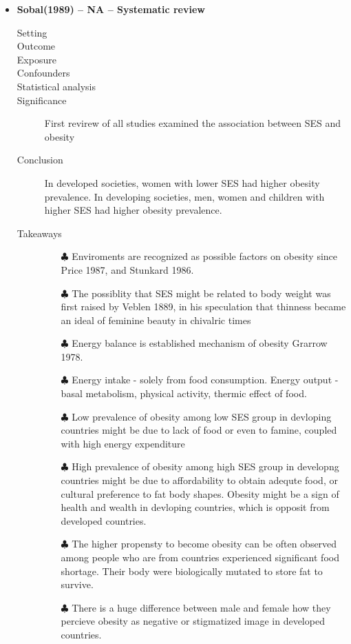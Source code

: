 \documentclass{article}
\begin{document}
\begin{itemize}
\newpage
\item{\bf Sobal(1989) -- NA -- Systematic review}
		\begin{description}
			\item[Setting] 
			\item[Outcome] 
			\item[Exposure] 
			\item[Confounders] 
			\item[Statistical analysis] 
			\item[Significance] First revirew of all studies examined the association between SES and obesity
			\item[Conclusion] In developed societies, women with lower SES had higher obesity prevalence. In developing societies, men, women and children with higher SES had higher obesity prevalence.
			\item[Takeaways] 
				\begin{itemize}
					\item[$\clubsuit$] Enviroments are recognized as possible factors on obesity since Price 1987, and Stunkard 1986.
					\item[$\clubsuit$] The possiblity that SES might be related to body weight was first raised by Veblen 1889, in his speculation that thinness became an ideal of feminine beauty in chivalric times
					\item[$\clubsuit$] Energy balance is established mechanism of obesity Grarrow 1978.
					\item[$\clubsuit$] Energy intake - solely from food consumption. Energy output - basal metabolism, physical activity, thermic effect of food.
					\item[$\clubsuit$] Low prevalence of obesity among low SES group in devloping countries might be due to lack of food or even to famine, coupled with high energy expenditure 
					\item[$\clubsuit$] High prevalence of obesity among high SES group in developng countries might be due to affordability to obtain adequte food, or cultural preference to fat body shapes. Obesity might be a sign of health and wealth in devloping countries, which is opposit from developed countries.
					\item[$\clubsuit$] The higher propensty to become obesity can be often observed among people who are from countries experienced significant food shortage. Their body were biologically mutated to store fat to survive.   
					\item[$\clubsuit$] There is a huge difference between male and female how they percieve obesity as negative or stigmatized image in developed countries. 


				\end{itemize} 
		\end{description}









\end{itemize}
\end{document}
